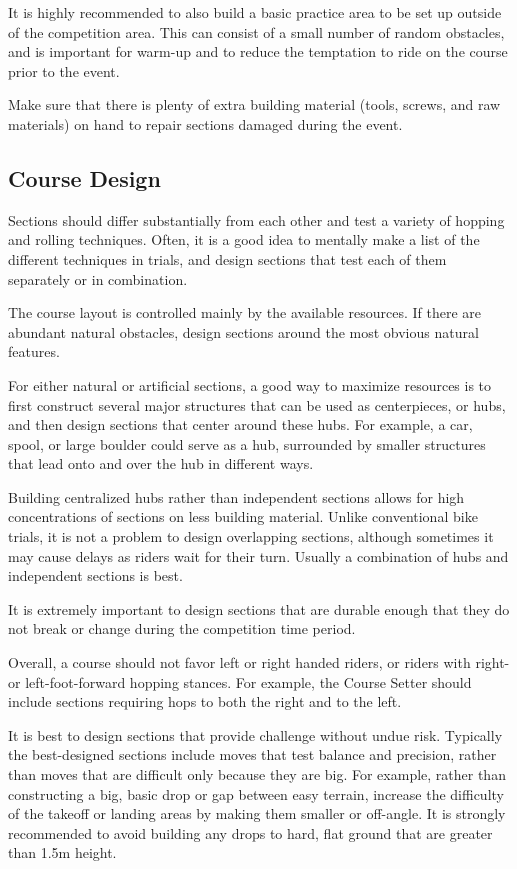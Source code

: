 It is highly recommended to also build a basic practice area to be set up outside of the competition area.
This can consist of a small number of random obstacles, and is important for warm-up and to reduce the temptation to ride on the course prior to the event.

Make sure that there is plenty of extra building material (tools, screws, and raw materials) on hand to repair sections damaged during the event.

\subsection{Course Design}
Sections should differ substantially from each other and test a variety of hopping and rolling techniques.
Often, it is a good idea to mentally make a list of the different techniques in trials, and design sections that test each of them separately or in combination.

The course layout is controlled mainly by the available resources.
If there are abundant natural obstacles, design sections around the most obvious natural features.

For either natural or artificial sections, a good way to maximize resources is to first construct several major structures that can be used as centerpieces, or hubs, and then design sections that center around these hubs.
For example, a car, spool, or large boulder could serve as a hub, surrounded by smaller structures that lead onto and over the hub in different ways.

Building centralized hubs rather than independent sections allows for high concentrations of sections on less building material.
Unlike conventional bike trials, it is not a problem to design overlapping sections, although sometimes it may cause delays as riders wait for their turn.
Usually a combination of hubs and independent sections is best.

It is extremely important to design sections that are durable enough that they do not break or change during the competition time period.

Overall, a course should not favor left or right handed riders, or riders with right- or left-foot-forward hopping stances.
For example, the Course Setter should include sections requiring hops to both the right and to the left.

It is best to design sections that provide challenge without undue risk.
Typically the best-designed sections include moves that test balance and precision, rather than moves that are difficult only because they are big.
For example, rather than constructing a big, basic drop or gap between easy terrain, increase the difficulty of the takeoff or landing areas by making them smaller or off-angle.
It is strongly recommended to avoid building any drops to hard, flat ground that are greater than 1.5m height.

